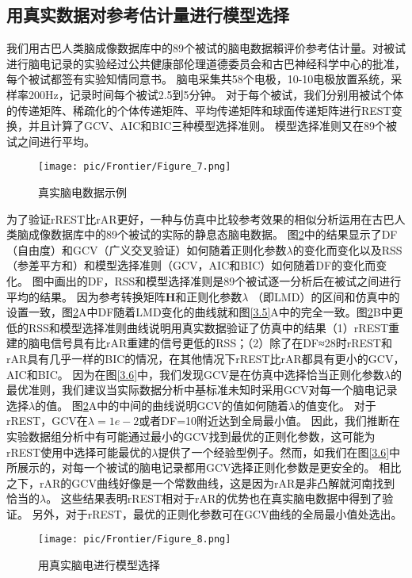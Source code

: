 \subsection{用真实数据对参考估计量进行模型选择}
我们用古巴人类脑成像数据库中的89个被试的脑电数据賴评价参考估计量。对被试进行脑电记录的实验经过公共健康部伦理道德委员会和古巴神经科学中心的批准，每个被试都签有实验知情同意书。 脑电采集共58个电极，10-10电极放置系统，采样率200Hz，记录时间每个被试2.5到5分钟。 对于每个被试，我们分别用被试个体的传递矩阵、稀疏化的个体传递矩阵、平均传递矩阵和球面传递矩阵进行REST变换，并且计算了GCV、AIC和BIC三种模型选择准则。 模型选择准则又在89个被试之间进行平均。 
\begin{figure}[!ht]
	\centering
	\texttt{[image: pic/Frontier/Figure\_7.png]}
	\caption{真实脑电数据示例}
	\label{3.7}
\end{figure}
为了验证rREST比rAR更好，一种与仿真中比较参考效果的相似分析运用在古巴人类脑成像数据库中的89个被试的实际的静息态脑电数据。 图\ref{3.8}中的结果显示了DF（自由度）和GCV（广义交叉验证）如何随着正则化参数$\lambda$的变化而变化以及RSS（参差平方和）和模型选择准则（GCV，AIC和BIC）如何随着DF的变化而变化。 图中画出的DF，RSS和模型选择准则是89个被试逐一分析后在被试之间进行平均的结果。 因为参考转换矩阵$\mathbf{H}$和正则化参数$\lambda$ （即LMD）的区间和仿真中的设置一致，图\ref{3.8}A中DF随着LMD变化的曲线就和图\ref{3.5}A中的完全一致。图\ref{3.8}B中更低的RSS和模型选择准则曲线说明用真实数据验证了仿真中的结果（1）rREST重建的脑电信号具有比rAR重建的信号更低的RSS；（2）除了在DF≈28时rREST和rAR具有几乎一样的BIC的情况，在其他情况下rREST比rAR都具有更小的GCV，AIC和BIC。 因为在图\ref{3.6}中，我们发现GCV是在仿真中选择恰当正则化参数$\lambda$的最优准则，我们建议当实际数据分析中基标准未知时采用GCV对每一个脑电记录选择$\lambda$的值。 图\ref{3.8}A中的中间的曲线说明GCV的值如何随着$\lambda$的值变化。 对于rREST，GCV在$\lambda=1e-2$或者DF=10附近达到全局最小值。 因此，我们推断在实验数据组分析中有可能通过最小的GCV找到最优的正则化参数，这可能为rREST使用中选择可能最优的$\lambda$提供了一个经验型例子。然而，如我们在图\ref{3.6}中所展示的，对每一个被试的脑电记录都用GCV选择正则化参数是更安全的。 相比之下，rAR的GCV曲线好像是一个常数曲线，这是因为rAR是非凸解就河南找到恰当的$\lambda$。 这些结果表明rREST相对于rAR的优势也在真实脑电数据中得到了验证。 另外，对于rREST，最优的正则化参数可在GCV曲线的全局最小值处选出。
\begin{figure}[!ht]
	\centering
	\texttt{[image: pic/Frontier/Figure\_8.png]}
	\caption{用真实脑电进行模型选择}
	\label{3.8}
\end{figure}

